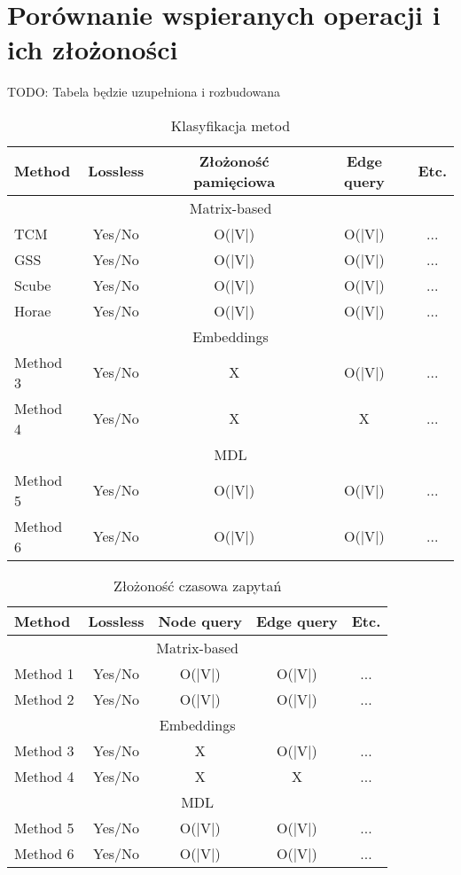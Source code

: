 \section{Porównanie wspieranych operacji i ich złożoności}
    TODO: Tabela będzie uzupełniona i rozbudowana

    \begin{table}[htbp]
        \centering
        \caption{Klasyfikacja metod}
        \begin{tabular}{l | c | c | c | c}
        \toprule
        \textbf{Method} & \textbf{Lossless} & \textbf{Złożoność pamięciowa} & \textbf{Edge query} & \textbf{Etc.} \\
        \midrule
        \multicolumn{5}{c}{Matrix-based} \\
        \midrule
        TCM & Yes/No & O(|V|) & O(|V|) & ... \\
        GSS & Yes/No & O(|V|) & O(|V|) & ... \\
        Scube & Yes/No & O(|V|) & O(|V|) & ... \\
        Horae & Yes/No & O(|V|) & O(|V|) & ... \\
        \midrule
        \multicolumn{5}{c}{Embeddings} \\
        \midrule
        Method 3 & Yes/No & X & O(|V|) & ... \\
        Method 4 & Yes/No & X & X & ... \\
        \midrule
        \multicolumn{5}{c}{MDL} \\
        \midrule
        Method 5 & Yes/No & O(|V|) & O(|V|) & ... \\
        Method 6 & Yes/No & O(|V|) & O(|V|) & ... \\
        \bottomrule
        \end{tabular}
    \end{table}

    \begin{table}[htbp]
        \centering
        \caption{Złożoność czasowa zapytań}
        \begin{tabular}{l | c | c | c | c}
        \toprule
        \textbf{Method} & \textbf{Lossless} & \textbf{Node query} & \textbf{Edge query} & \textbf{Etc.} \\
        \midrule
        \multicolumn{5}{c}{Matrix-based} \\
        \midrule
        Method 1 & Yes/No & O(|V|) & O(|V|) & ... \\
        Method 2 & Yes/No & O(|V|) & O(|V|) & ... \\
        \midrule
        \multicolumn{5}{c}{Embeddings} \\
        \midrule
        Method 3 & Yes/No & X & O(|V|) & ... \\
        Method 4 & Yes/No & X & X & ... \\
        \midrule
        \multicolumn{5}{c}{MDL} \\
        \midrule
        Method 5 & Yes/No & O(|V|) & O(|V|) & ... \\
        Method 6 & Yes/No & O(|V|) & O(|V|) & ... \\
        \bottomrule
        \end{tabular}
    \end{table}